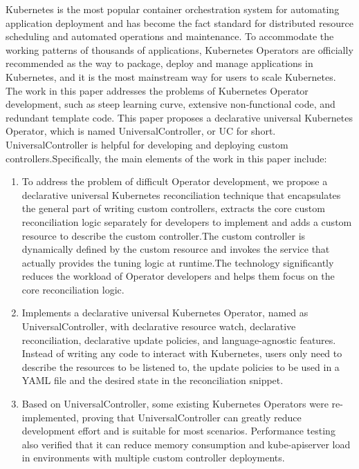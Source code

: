 \documentclass[macfonts,master]{njuthesis}
\begin{document}
\begin{englishabstract}
Kubernetes is the most popular container orchestration system for automating application deployment and has become the fact standard for distributed resource scheduling and automated operations and maintenance. To accommodate the working patterns of thousands of applications, Kubernetes Operators are officially recommended as the way to package, deploy and manage applications in Kubernetes, and it is the most mainstream way for users to scale Kubernetes. The work in this paper addresses the problems of Kubernetes Operator development, such as steep learning curve, extensive non-functional code, and redundant template code. This paper proposes a declarative universal Kubernetes Operator, which is named UniversalController, or UC for short. UniversalController is helpful for developing and deploying custom controllers.Specifically, the main elements of the work in this paper include:

\begin{enumerate}
	\item To address the problem of difficult Operator development, we propose a declarative universal Kubernetes reconciliation technique that encapsulates the general part of writing custom controllers, extracts the core custom reconciliation logic separately for developers to implement and adds a custom resource to describe the custom controller.The custom controller is dynamically defined by the custom resource and invokes the service that actually provides the tuning logic at runtime.The technology significantly reduces the workload of Operator developers and helps them focus on the core reconciliation logic. 
	\item Implements a declarative universal Kubernetes Operator, named as UniversalController, with declarative resource watch, declarative reconciliation, declarative update policies, and language-agnostic features. Instead of writing any code to interact with Kubernetes, users only need to describe the resources to be listened to, the update policies to be used in a YAML file and the desired state in the reconciliation snippet.
	\item Based on UniversalController, some existing Kubernetes Operators were re-implemented, proving that UniversalController can greatly reduce development effort and is suitable for most scenarios. Performance testing also verified that it can reduce memory consumption and kube-apiserver load in environments with multiple custom controller deployments.
\end{enumerate}

\end{englishabstract}
\end{document}
